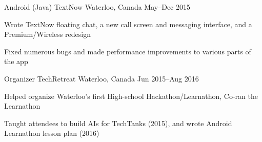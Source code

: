 \begin{cventries}
  \cventry
    {Android (Java)} %
    {TextNow} %
    {Waterloo, Canada} %
    {May--Dec 2015} %
    {
      \begin{cvitems} %
        \item {Wrote TextNow floating chat, a new call screen and messaging interface, and a Premium/Wireless redesign}
        \item {Fixed numerous bugs and made performance improvements to various parts of the app}
      \end{cvitems}
    }

  \cventry
    {Organizer} %
    {TechRetreat} %
    {Waterloo, Canada} %
    {Jun 2015--Aug 2016} %
    {
      \begin{cvitems} %
        \item {Helped organize Waterloo’s first High-school Hackathon/Learnathon, Co-ran the Learnathon}
        \item {Taught attendees to build AIs for TechTanks (2015), and wrote Android Learnathon lesson plan (2016)}
      \end{cvitems}
    }

\end{cventries}

